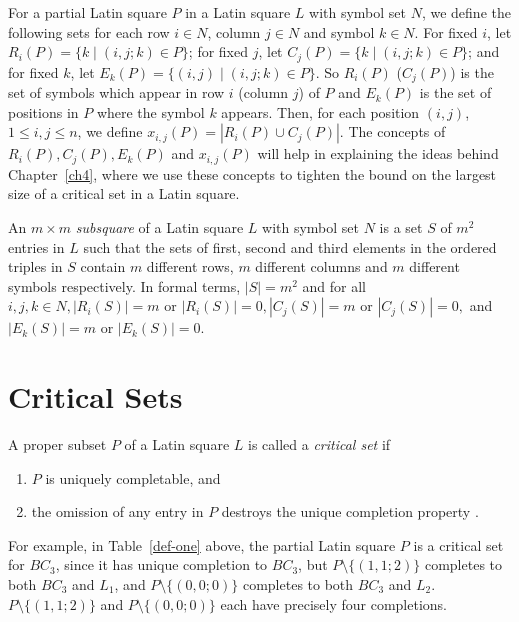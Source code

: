 \documentclass[12pt]{report}
\begin{document}
For a partial Latin square $P$ in a Latin square $L$ with symbol set $N$, we define the following sets for each
row $i \in N$, column $j \in N$ and symbol $k \in N$. For fixed $i$, let $R_i(P) = \{ k \mid (i, j; k)
\in P \}$; for fixed $j$, let $C_j(P) = \{ k \mid (i, j; k) \in P \}$; and for fixed $k$, let $E_k(P) = \{ (i,j)
\mid (i, j; k) \in P \}$.  So $R_i(P)$ ($C_j(P)$) is the set of symbols which
appear in row $i$ (column $j$) of $P$ and $E_k(P)$ is the set of positions in $P$ where the
symbol $k$ appears.  Then, for each position $(i,j)$, $1 \leq i,j \leq
n$, we define $x_{i,j}(P) = | R_i(P) \cup C_j(P) |$.  The concepts of $R_i(P),
C_j(P), E_k(P)$ and $x_{i,j}(P)$ will help in explaining the ideas behind Chapter~\ref{ch4}, where we use these concepts to
tighten the bound on the largest size of a critical set in a Latin square.

An $m \times m$ {\it subsquare} of a Latin square $L$ with symbol set $N$ is a set $S$ of $m^2$
entries in $L$ such that the sets of first, second and third elements in 
the ordered triples in $S$ contain $m$ different rows,
$m$ different columns and $m$ different symbols respectively.  In formal terms, $|S| = m^2$ and
for all $i, j, k \in N, 
|R_i(S)| = m$ or $|R_i(S)| = 0, |C_j(S)| = m$ or $|C_j(S)| = 0,$ and $|E_k(S)| = m$ or $|E_k(S)| = 0$.

\section{Critical Sets}
A proper subset $P$ of a Latin square $L$ is called a {\it critical set} if
\begin{enumerate}
\item $P$ is uniquely completable, and
\item the omission of any entry in $P$ 
destroys the unique completion property \cite{Nel1}.
\end{enumerate}
For example, in Table~\ref{def-one} above, the partial Latin square $P$ is
a critical set for $BC_3$, since it has unique completion to $BC_3$,
but $P \setminus \{ (1,1;2) \}$ completes
to both $BC_3$ and $L_1$, and $P \setminus \{ (0,0;0) \}$
completes to both $BC_3$ and $L_2$.  $P \setminus \{ (1,1;2) \}$ and
$P \setminus \{ (0,0;0) \}$ each have precisely four completions.
\end{document}
